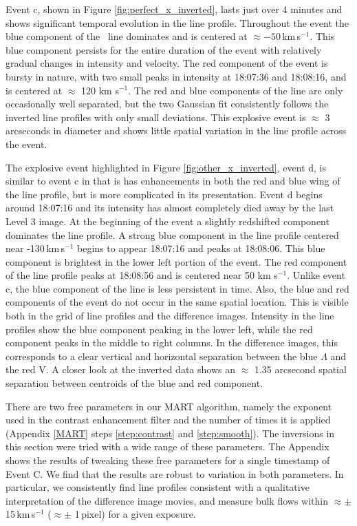 		Event c, shown in Figure \ref{fig:perfect_x_inverted}, lasts just over 4 minutes and shows significant temporal evolution in the line profile.
		Throughout the event the blue component of the \ov \ line dominates and is centered at $\approx -50$\,km\,s$^{-1}$.
		This blue component persists for the entire duration of the event with %
		relatively gradual changes in intensity and velocity.
		The red component of the event is bursty in nature, with two small peaks in intensity at 18:07:36 and 18:08:16, and is centered at $\approx$ 120 km s$^{-1}$. 
	    The red and blue components of the line are only occasionally well separated, but the two Gaussian fit consistently follows the inverted line profiles with only small deviations.
		This explosive event is $\approx$ 3 arcseconds in diameter and shows little spatial variation in the line profile across the event.
		
		The explosive event highlighted in Figure \ref{fig:other_x_inverted}, event d, is similar to event c in that is has enhancements in both the red and blue wing of the line profile, but is more complicated in its presentation.
		Event d  begins around 18:07:16 and its intensity has almost completely died away by the last Level 3 image.
		At the beginning of the event a slightly redshifted component dominates the line profile.
		A strong blue component in the line profile centered near -130\,km\,s$^{-1}$ begins to appear 18:07:16 and peaks at 18:08:06. 
		This blue component is brightest in the lower left portion of the event.
		The red component of the line profile peaks at 18:08:56 and is centered near 50 km s$^{-1}$.
		Unlike event c, the blue component of the line is less persistent in time.
		Also, the blue and red components of the event do not occur in the same spatial location.
		This is visible both in the grid of line profiles and the difference images.
		Intensity in the line profiles show the blue component peaking in the lower left, while the red component peaks in the middle to right columns.
		In the difference images, this corresponds to a clear vertical and horizontal separation between the blue $\Lambda$ and the red V. 
		A closer look at the inverted data shows an $\approx$ 1.35 arcsecond spatial separation between centroids of the blue and red component.
	    		   	
        There are two free parameters in our MART algorithm, namely the exponent used in the contrast enhancement filter and the number of times it is applied (Appendix \ref{MART} steps \ref{step:contrast} and \ref{step:smooth}). The inversions in this section were tried with a wide range of these parameters. 
        The Appendix shows the results of tweaking these free parameters for a single timestamp of Event C.
        We find that the results are robust to variation in both parameters. 
        In particular, we consistently find line profiles consistent with a qualitative interpretation of the difference image movies, and measure bulk flows within $\approx\pm$ 15\,km\,s$^{-1}$ ($\approx\pm$ 1\,pixel) for a given exposure. 
    
